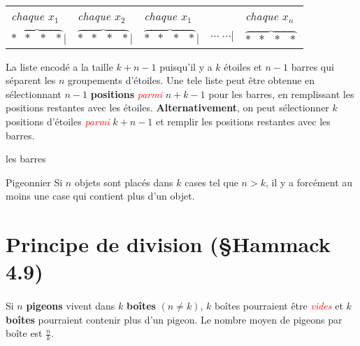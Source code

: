 \documentclass[8pt]{report}
\begin{document}
\begin{multicols*}{2}
\begin{Definitionx*}{}{}
   \begin{table}[H]
     \begin{center}
       \renewcommand{\arraystretch}{1.5}
       \selectfont
       \footnotesize
           \begin{tabular}{l l l l l}
               \textit{ chaque $x_1$} & \textit{chaque $x_2$} 
                              & \textit{chaque $x_1$}
                              & & \textit{chaque $x_n$}
            \\
               $\overbrace{*\;\;*\;\;*\;\;*}|$ & $\overbrace{*\;\;*\;\;*\;\;*}|$ 
                                               & $\overbrace{*\;\;*\;\;*\;\;*}|$ 
                                               & $\cdots \; \cdots  |$ 
                                               & $\overbrace{*\;\;*\;\;*\;\;*}$
           \\
           \end{tabular}
   \end{center}
   \end{table}
   La liste encodé a la taille $k+n -1$ puisqu'il y a $k$ étoiles et $n-1$ barres qui séparent les 
   $n$ groupements d'étoiles. Une tele liste peut être obtenue en sélectionnant $n-1$ \textbf{positions}
   \textcolor{red}{\textit{parmi}} $n+k-1$  pour les barres, en remplissant les positions restantes 
   avec les étoiles. \textbf{Alternativement}, on peut sélectionner $k$ positions d'étoiles
   \textcolor{red}{\textit{parmi}} $k+n-1$ et remplir les positions restantes avec les barres. 

   les barres 
\end{Definitionx*}

\begin{Concept}{Pigeonnier}{}
Si $n$ objets sont placés dans $k$ cases tel que $n > k$, il y a forcément au moins une case 
qui contient plus d'un objet. 
\end{Concept}

\section{Principe de division (\S Hammack 4.9)}
        \paragraph{}
        Si $n$ \textbf{pigeons} vivent dans $k$ \textbf{boîtes} $(n \neq k)$, $k$ boîtes pourraient             
        être \textcolor{red}{\textit{vides}} et $k$ \textbf{boîtes} pourraient contenir plus d'un pigeon. 
        Le nombre moyen de pigeons par boîte est $\frac{n}{k}$. 
        

\end{multicols*}
\end{document}
